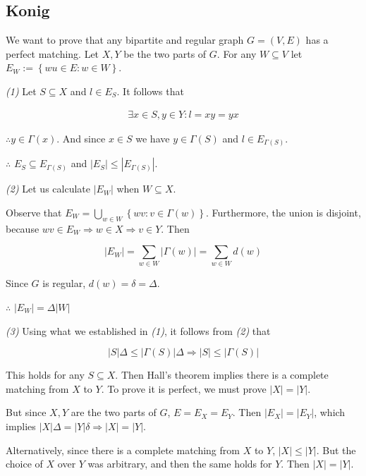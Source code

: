 \documentclass[a4paper, 12pt]{article}
\begin{document}
\subsection{Konig}

We want to prove that any bipartite and regular graph $G = (V, E) $ has a
perfect matching. Let $X, Y$ be the two parts of $G$. For any $W \subseteq V$
let $E_W := \left\{ wu \in E : w \in W \right\} $.

\textit{(1)} Let $S \subseteq X$ and $l \in E_S$. It follows that

\begin{align*}
    \exists x \in S, y \in Y : l = xy = yx 
\end{align*}

$\therefore y \in \Gamma(x)$. And since $x \in  S$ we have $y \in \Gamma(S)$ 
and $l \in E_{\Gamma(S)}$.

$\therefore $ $E_S \subseteq E_{\Gamma(S)}$ and $|E_S| \leq |E_{\Gamma(S)}|$.

\textit{(2)} Let us calculate $|E_W|$ when $W \subseteq X$.

Observe that $E_W = \bigcup_{w \in W} \left\{ wv : v \in \Gamma(w) \right\} $.
Furthermore, the union is disjoint, because $wv \in E_W \Rightarrow w \in X
\Rightarrow v \in Y$. Then

\begin{equation*}
    |E_W| = \sum_{w \in W} |\Gamma(w)| = \sum_{w \in W} d(w)
\end{equation*}

Since $G$ is regular, $d(w) = \delta = \Delta$. 

$\therefore $ $|E_W| = \Delta |W|$

\textit{(3)} Using what we established in \textit{(1)}, it follows from \textit{(2)} that

\begin{equation*}
    |S| \Delta \leq |\Gamma(S)| \Delta \Rightarrow |S| \leq |\Gamma(S)| 
\end{equation*}

This holds for any $S \subseteq X$. Then Hall's theorem implies there is a
complete matching from $X$ to $Y$. To prove it is perfect, we must prove $|X| =
|Y|$.

But since $X, Y$ are the two parts of $G$, $E = E_X = E_Y$. Then $|E_X| =
|E_Y|$, which implies $|X| \Delta = |Y| \delta \Rightarrow |X| =
|Y|$.

Alternatively, since there is a complete matching from $X$ to $Y$, $|X| \leq
|Y|$. But the choice of $X$ over $Y$ was arbitrary, and then the same holds for
$Y$. Then $|X| = |Y|$.
\end{document}

